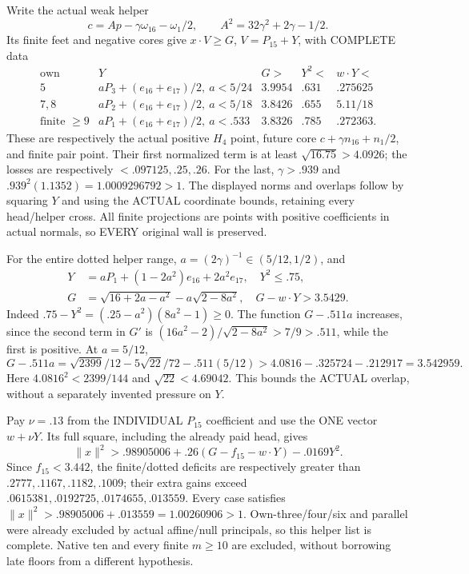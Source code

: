 \documentclass[11pt]{article}
\theoremstyle{definition}
\theoremstyle{remark}
\begin{document}
Write the actual weak helper
\[
 c=Ap-\gamma\omega_{16}-\omega_1/2,\qquad
                              A^2=32\gamma^2+2\gamma-1/2 .
\]
Its finite feet and negative cores give \(x\cdot V\ge G\),
\(V=P_{15}+Y\), with COMPLETE data
\[
\begin{array}{c|c|c|c|c}
 \text{own}&Y&G>&Y^2<&w\cdot Y<\\ \hline
 5&aP_3+(e_{16}+e_{17})/2,\ a<5/24&3.9954&.631&.275625\\
 7,8&aP_2+(e_{16}+e_{17})/2,\ a<5/18&3.8426&.655&5.11/18\\
 \text{finite }\ge9&aP_1+(e_{16}+e_{17})/2,\ a<.533
                                       &3.8326&.785&.272363 .
\end{array}
\]
These are respectively the actual positive \(H_4\) point, future core
\(c+\gamma n_{16}+n_1/2\), and finite pair point.
Their first normalized term is at least \(\sqrt{16.75}>4.0926\);
the losses are respectively \(<.097125,.25,.26\).
For the last, \(\gamma>.939\) and
\(.939^2(1.1352)=1.0009296792>1\).
The displayed norms and overlaps follow by squaring \(Y\) and using
the ACTUAL coordinate bounds, retaining every head/helper cross.
All finite projections are points with positive coefficients in actual
normals, so EVERY original wall is preserved.

For the entire dotted helper range,
\(a=(2\gamma)^{-1}\in(5/12,1/2)\), and
\[
\begin{split}
 Y&=aP_1+(1-2a^2)e_{16}+2a^2e_{17},\quad Y^2\le.75,\\
 G&=\sqrt{16+2a-a^2}-a\sqrt{2-8a^2},\quad
                                              G-w\cdot Y>3.5429 .
\end{split}
\]
Indeed \(.75-Y^2=(.25-a^2)(8a^2-1)\ge0\).
The function \(G-.511a\) increases, since the second term in \(G'\)
is \((16a^2-2)/\sqrt{2-8a^2}>7/9>.511\), while the first is positive.
At \(a=5/12\),
\[
 G-.511a=\sqrt{2399}/12-5\sqrt{22}/72-.511(5/12)
                    >4.0816-.325724-.212917=3.542959 .
\]
Here \(4.0816^2<2399/144\) and \(\sqrt{22}<4.69042\).
This bounds the ACTUAL overlap, without a separately invented pressure
on \(Y\).

Pay \(\nu=.13\) from the INDIVIDUAL \(P_{15}\) coefficient and use
the ONE vector \(w+\nu Y\).
Its full square, including the already paid head, gives
\[
              \|x\|^2>.98905006+.26(G-f_{15}-w\cdot Y)-.0169Y^2 .
\]
Since \(f_{15}<3.442\), the finite/dotted deficits are respectively
greater than \(.2777,\allowbreak .1167,\allowbreak .1182,\allowbreak .1009\); their extra gains exceed
\(.0615381,\allowbreak .0192725,\allowbreak .0174655,\allowbreak .013559\).
Every case satisfies
\(\|x\|^2>.98905006+.013559=1.00260906>1\).
Own-three/four/six and parallel were already excluded by actual
affine/null principals, so this helper list is complete.
Native ten and every finite \(m\ge10\) are excluded, without borrowing
late floors from a different hypothesis.
\end{document}
